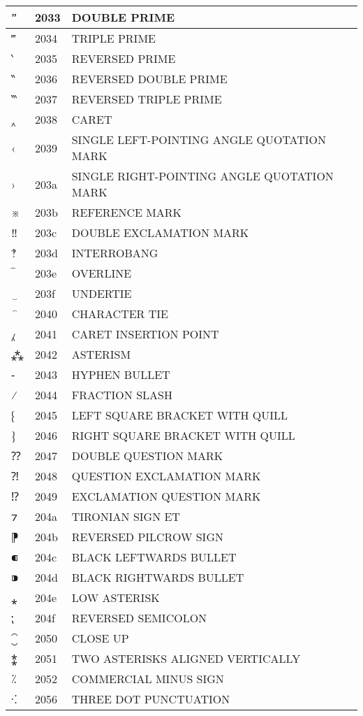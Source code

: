 \documentclass[12pt,letterpaper,openany]{book}
\begin{document}
\begin{center}
\begin{supertabular}{|m{0.25in}|m{0.5in}|m{4in}|}
″ & 2033 & DOUBLE PRIME\\\hline
‴ & 2034 & TRIPLE PRIME\\\hline
‵ & 2035 & REVERSED PRIME\\\hline
‶ & 2036 & REVERSED DOUBLE PRIME\\\hline
‷ & 2037 & REVERSED TRIPLE PRIME\\\hline
‸ & 2038 & CARET\\\hline
‹ & 2039 & SINGLE LEFT-POINTING ANGLE QUOTATION MARK\\\hline
› & 203a & SINGLE RIGHT-POINTING ANGLE QUOTATION MARK\\\hline
※ & 203b & REFERENCE MARK\\\hline
‼ & 203c & DOUBLE EXCLAMATION MARK\\\hline
‽ & 203d & INTERROBANG\\\hline
‾ & 203e & OVERLINE\\\hline
‿ & 203f & UNDERTIE\\\hline
⁀ & 2040 & CHARACTER TIE\\\hline
⁁ & 2041 & CARET INSERTION POINT\\\hline
⁂ & 2042 & ASTERISM\\\hline
⁃ & 2043 & HYPHEN BULLET\\\hline
⁄ & 2044 & FRACTION SLASH\\\hline
⁅ & 2045 & LEFT SQUARE BRACKET WITH QUILL\\\hline
⁆ & 2046 & RIGHT SQUARE BRACKET WITH QUILL\\\hline
⁇ & 2047 & DOUBLE QUESTION MARK\\\hline
⁈ & 2048 & QUESTION EXCLAMATION MARK\\\hline
⁉ & 2049 & EXCLAMATION QUESTION MARK\\\hline
⁊ & 204a & TIRONIAN SIGN ET\\\hline
⁋ & 204b & REVERSED PILCROW SIGN\\\hline
⁌ & 204c & BLACK LEFTWARDS BULLET\\\hline
⁍ & 204d & BLACK RIGHTWARDS BULLET\\\hline
⁎ & 204e & LOW ASTERISK\\\hline
⁏ & 204f & REVERSED SEMICOLON\\\hline
⁐ & 2050 & CLOSE UP\\\hline
⁑ & 2051 & TWO ASTERISKS ALIGNED VERTICALLY\\\hline
⁒ & 2052 & COMMERCIAL MINUS SIGN\\\hline
⁖ & 2056 & THREE DOT PUNCTUATION\\\hline

\end{supertabular}
\end{center}
\end{document}
